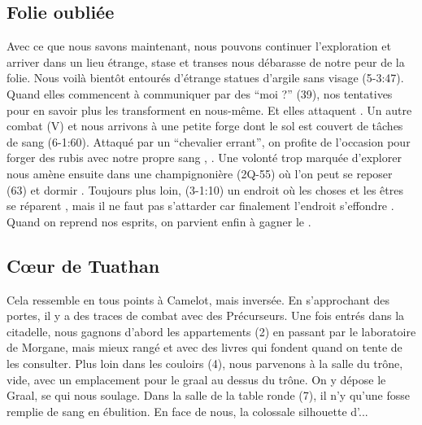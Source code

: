 \documentclass[11pt]{article}
\begin{document}
\subsection{Folie oubliée}
Avec ce que nous savons maintenant, nous pouvons continuer l'exploration et arriver dans un lieu étrange, stase et transes nous débarasse de notre peur de la folie. Nous voilà bientôt entourés d'étrange statues d'argile sans visage (5-3:47). Quand elles commencent à communiquer par des ``moi ?'' (39), nos tentatives pour en savoir plus les transforment en nous-même. Et elles attaquent . Un autre combat (V) et nous arrivons à une petite forge dont le sol est couvert de tâches de sang (6-1:60). Attaqué par un ``chevalier errant'', on profite de l'occasion pour forger des rubis avec notre propre sang , . Une volonté trop marquée d'explorer nous amène ensuite dans une champignonière (2Q-55) où l'on peut se reposer (63) \gain{\nrj[1]} et dormir  . Toujours plus loin, (3-1:10) un endroit où les choses et les êtres se réparent \gain{\life[1]}, mais il ne faut pas s'attarder car finalement l'endroit s'effondre  . Quand on reprend nos esprits, on parvient enfin à gagner le \coeurtuathan{}.

\subsection{C\oe{}ur de Tuathan}
Cela ressemble en tous points à Camelot, mais inversée. En s'approchant des portes, il y a des traces de combat avec des Précurseurs. Une fois entrés dans la citadelle, nous gagnons d'abord les appartements (2) en passant par le laboratoire de Morgane, mais mieux rangé et avec des livres qui fondent quand on tente de les consulter. Plus loin dans les couloirs (4), nous parvenons à la salle du trône, vide, avec un emplacement pour le graal au dessus du trône. On y dépose le Graal, se qui nous soulage. Dans la salle de la table ronde (7), il n'y qu'une fosse remplie de sang en ébulition. En face de nous, la colossale silhouette d'\arthur{}...
\end{document}
